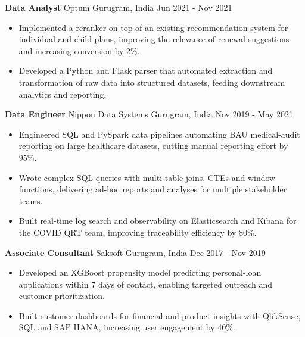 \documentclass[10pt,a4paper]{article}
\newcommand{\role}[4]{\textbf{#1} \textbar{} #2 \hfill #3 \textbar{} #4\par}
\begin{document}
\vspace{3pt}
\role{Data Analyst}{Optum}{Gurugram, India}{Jun 2021 - Nov 2021}
\begin{itemize}
  \item Implemented a reranker on top of an existing recommendation system for individual and child plans, improving the relevance of renewal suggestions and increasing conversion by 2\%.
  \item Developed a Python and Flask parser that automated extraction and transformation of raw data into structured datasets, feeding downstream analytics and reporting.
\end{itemize}
\vspace{3pt}
\role{Data Engineer}{Nippon Data Systems}{Gurugram, India}{Nov 2019 - May 2021}
\begin{itemize}
  \item Engineered SQL and PySpark data pipelines automating BAU medical-audit reporting on large healthcare datasets, cutting manual reporting effort by 95\%.
  \item Wrote complex SQL queries with multi-table joins, CTEs and window functions, delivering ad-hoc reports and analyses for multiple stakeholder teams.
  \item Built real-time log search and observability on Elasticsearch and Kibana for the COVID QRT team, improving traceability efficiency by 80\%.
\end{itemize}
\vspace{3pt}
\role{Associate Consultant}{Saksoft}{Gurugram, India}{Dec 2017 - Nov 2019}
\begin{itemize}
  \item Developed an XGBoost propensity model predicting personal-loan applications within 7 days of contact, enabling targeted outreach and customer prioritization.
  \item Built customer dashboards for financial and product insights with QlikSense, SQL and SAP HANA, increasing user engagement by 40\%.
\end{itemize}
\end{document}
